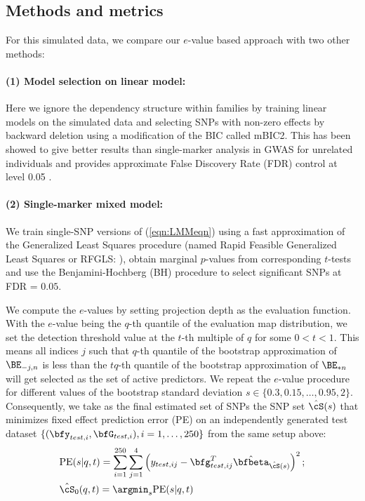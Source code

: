 \subsection{Methods and metrics}
For this simulated data, we compare our $e$-value based approach with two other methods:

\paragraph{(1) Model selection on linear model:} Here we ignore the dependency structure within families by training linear models on the simulated data and selecting SNPs with non-zero effects by backward deletion using a modification of the BIC called mBIC2. This has been showed to give better results than single-marker analysis in GWAS for unrelated individuals \citep{FrommeletEtal12} and provides approximate False Discovery Rate (FDR) control at level 0.05 \citep{BogdanEtal11}.

\paragraph{(2) Single-marker mixed model:} We train single-SNP versions of (\ref{eqn:LMMeqn}) using a fast approximation of the Generalized Least Squares procedure (named Rapid Feasible Generalized Least Squares or RFGLS: \cite{LiEtal11}), obtain marginal $p$-values from corresponding $t$-tests and use the Benjamini-Hochberg (BH) procedure to select significant SNPs at FDR = $0.05$.

\vspace{1em}\noindent We compute the $e$-values by setting projection depth \citep{zuo03} as the evaluation function. With the $e$-value being the $q$-th quantile of the evaluation map distribution, we set the detection threshold value at the $t$-th multiple of $q$ for some $0 < t < 1$. This means all indices $j$ such that $q$-th quantile of the bootstrap approximation of $\BE_{-j,n} $ is less than the $tq$-th quantile of the bootstrap approximation of $\BE_{* n}$ will get selected as the set of active predictors. We repeat the $e$-value procedure for different values of the bootstrap standard deviation $s \in \{ 0.3, 0.15, \ldots, 0.95, 2 \}$. Consequently, we take as the final estimated set of SNPs the SNP set $\hat \cS (s)$ that minimizes fixed effect prediction error (PE) on an independently generated test dataset $\{ (\bfy_{test,i}, \bfG_{test,i}), i = 1, \ldots, 250 \}$ from the same setup above:
%
\begin{align*}
& \text{PE} (s | q,t)  = \sum_{i=1}^{250} \sum_{j=1}^4 \left( y_{test,ij} - \bfg_{test,ij}^T \hat \bfbeta_{\hat \cS (s)} \right)^2; \\
& \hat \cS_0 (q,t) = \argmin_s \text{PE} (s | q,t)
\end{align*}

